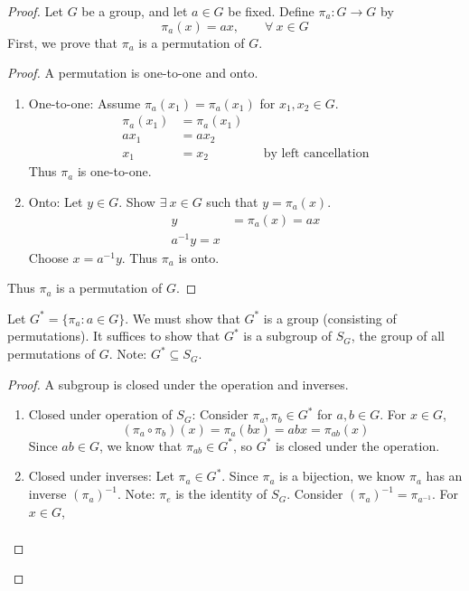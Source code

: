 \begin{proof}
    Let $G$ be a group, and let $a \in G$ be fixed. Define $\pi_a: G \rightarrow G$ by
    \[
        \pi_a(x) = ax, \qquad \forall~x \in G
    \]
    First, we prove that $\pi_a$ is a permutation of $G$.
    \begin{proof}
        A permutation is one-to-one and onto.
        \begin{enumerate}
            \item One-to-one: Assume $\pi_a(x_1) = \pi_a(x_1)$ for $x_1,x_2 \in G$.
            \begin{align*}
                \pi_a(x_1) & = \pi_a(x_1) \\
                ax_1 & = ax_2 \\
                x_1 & = x_2 && \text{by left cancellation}
            \end{align*}
            Thus $\pi_a$ is one-to-one.
            \item Onto: Let $y \in G$. Show $\exists~x \in G$ such that $y = \pi_a(x)$.
            \begin{align*}
                y & = \pi_a(x) = ax \\
                a^{-1}y = x
            \end{align*}
            Choose $x = a^{-1}y$. Thus $\pi_a$ is onto.
        \end{enumerate}
        Thus $\pi_a$ is a permutation of $G$.
    \end{proof}
    Let $G^* = \{\pi_a : a \in G\}$. We must show that $G^*$ is a group (consisting of permutations). It suffices to show that $G^*$ is a subgroup of $S_G$, the group of all permutations of $G$. Note: $G^* \subseteq S_G$.
    \begin{proof}
        A subgroup is closed under the operation and inverses.
        \begin{enumerate}
            \item Closed under operation of $S_G$: Consider $\pi_a, \pi_b \in G^*$ for $a,b \in G$. For $x \in G$,
            \[
                (\pi_a \circ \pi_b)(x) = \pi_a(bx) = abx = \pi_{ab}(x)
            \]
            Since $ab \in G$, we know that $\pi_{ab} \in G^*$, so $G^*$ is closed under the operation.
            \item Closed under inverses: Let $\pi_a \in G^*$. Since $\pi_a$ is a bijection, we know $\pi_a$ has an inverse $(\pi_a)^{-1}$. Note: $\pi_e$ is the identity of $S_G$. Consider $(\pi_a)^{-1} = \pi_{a^{-1}}$. For $x \in G$,
            \begin{align*}

\end{align*}
\end{enumerate}
\end{proof}
\end{proof}

